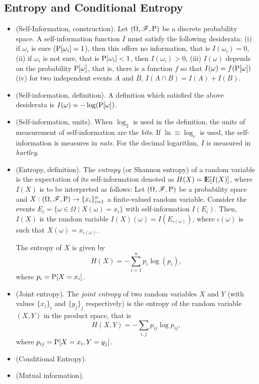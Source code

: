 \documentclass[a4paper,10pt]{article}
\begin{document}
\subsection{Entropy and Conditional Entropy}
\begin{itemize}
 \item (Self-Information, construction). Let $(\Omega,\mathscr{F},\mathrm{P})$ be a discrete probability space. A self-information function $I$ must satisfy the 
       following desiderata: 
       (i) if $\omega_i$ is sure ($\mathrm{P}[\omega_i]=1$), then this offers no information, that is $I(\omega_i)=0$, 
       (ii) if $\omega_i$ is not sure, that is $\mathrm{P}[\omega_i]<1$, then $I(\omega_i)>0$,
       (iii) $I(\omega)$ depends on the probability $\mathrm{P}[\omega]$, that is, there is a function $f$ so that $I(\omega)=f(\mathrm{P}[\omega])$
       (iv) for two independent events $A$ and $B$, $I(A\cap B)=I(A)+I(B)$.
 \item (Self-information, definition). A definition which satisfied the above desiderata is $I(\omega)=-\log(\mathrm{P}[\omega])$. 
 \item (Self-information, units). When $\log_2$ is used in the definition, the units of measurement of self-information are the \textit{bits}.
       If $\ln\equiv \log_e$ is used, the self-information is measures in \textit{nats}. 
       For the decimal logarithm, $I$ is measured in \textit{hartley}.
 \item (Entropy, definition). The \textit{entropy} (or Shannon entropy) of a random variable is the expectation of its self-information denoted 
       as $H(X)=\E[I(X)]$, where $I(X)$ is to be interpreted as follows: Let $(\Omega,\mathscr{F},\mathrm{P})$ be a probability space and $X:(\Omega,\mathscr{F},\mathrm{P})\to \{x_i\}_{i=1}^{n}$
       a finite-valued random variable. Consider the events $E_i=\{\omega\in\Omega {}\mid{} X(\omega) = x_i\}$ with self-information 
       $I(E_i)$. Then, $I(X)$ is the random variable $I(X)(\omega) = I(E_{\iota(\omega)})$, where $\iota(\omega)$ is such 
       that $X(\omega) = x_{\iota(\omega)}$.
       
       The entropy of $X$ is given by
       \[
        H(X) = -\sum_{i=1}^{n}p_i \log(p_i),
       \]
       where $p_i = \mathrm{P}[X=x_i]$.
 \item (Joint entropy). The \textit{joint entropy} of two random variables $X$ and $Y$ (with values $\{x_i\}_i$ and $\{y_j\}_j$
       respectively) is the entropy of the random variable 
       $(X,Y)$ in the product space, that is
       \[
        H(X,Y) = -\sum_{i,j}p_{ij}\log p_{ij},
       \]
       where $p_{ij} = \mathrm{P}[X=x_i, Y=y_j]$.
 \item (Conditional Entropy).
 \item (Mutual information).
\end{itemize}
\end{document}

